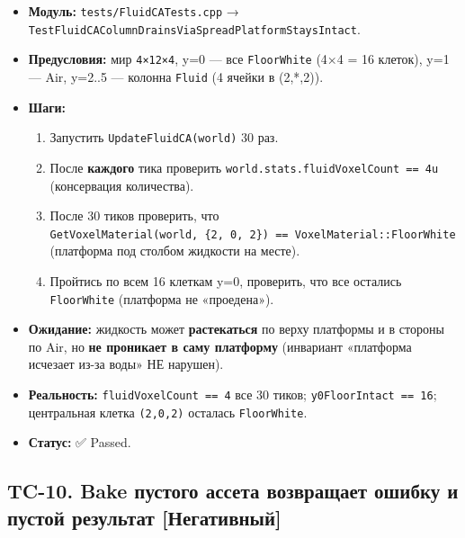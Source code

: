 \documentclass[
  11pt,a4paper,oneside]{article}
\providecommand{\tightlist}{%
  \setlength{\itemsep}{0pt}\setlength{\parskip}{0pt}}
\providecommand{\tightlist}{%
  \setlength{\itemsep}{0pt}\setlength{\parskip}{0pt}}
\begin{document}
\begin{itemize}
\tightlist
\item
  \textbf{Модуль:} \texttt{tests/FluidCATests.cpp} → \texttt{TestFluidCAColumnDrainsViaSpreadPlatformStaysIntact}.
\item
  \textbf{Предусловия:} мир \texttt{4×12×4}, y=0 --- все \texttt{FloorWhite} (4×4 = 16 клеток), y=1 --- Air, y=2..5 --- колонна \texttt{Fluid} (4 ячейки в (2,*,2)).
\item
  \textbf{Шаги:}

  \begin{enumerate}
  \def\labelenumi{\arabic{enumi}.}
  \tightlist
  \item
    Запустить \texttt{UpdateFluidCA(world)} 30 раз.
  \item
    После \textbf{каждого} тика проверить \texttt{world.stats.fluidVoxelCount\ ==\ 4u} (консервация количества).
  \item
    После 30 тиков проверить, что \texttt{GetVoxelMaterial(world,\ \{2,\ 0,\ 2\})\ ==\ VoxelMaterial::FloorWhite} (платформа под столбом жидкости на месте).
  \item
    Пройтись по всем 16 клеткам y=0, проверить, что все остались \texttt{FloorWhite} (платформа не «проедена»).
  \end{enumerate}
\item
  \textbf{Ожидание:} жидкость может \textbf{растекаться} по верху платформы и в стороны по Air, но \textbf{не проникает в саму платформу} (инвариант «платформа исчезает из-за воды» НЕ нарушен).
\item
  \textbf{Реальность:} \texttt{fluidVoxelCount\ ==\ 4} все 30 тиков; \texttt{y0FloorIntact\ ==\ 16}; центральная клетка \texttt{(2,0,2)} осталась \texttt{FloorWhite}.
\item
  \textbf{Статус:} ✅ Passed.
\end{itemize}

\subsection{TC-10. Bake пустого ассета возвращает ошибку и пустой результат {[}Негативный{]}}\label{tc-10-bake-ux43fux443ux441ux442ux43eux433ux43e-ux430ux441ux441ux435ux442ux430-ux432ux43eux437ux432ux440ux430ux449ux430ux435ux442-ux43eux448ux438ux431ux43aux443-ux438-ux43fux443ux441ux442ux43eux439-ux440ux435ux437ux443ux43bux44cux442ux430ux442-ux43dux435ux433ux430ux442ux438ux432ux43dux44bux439}
\end{document}
